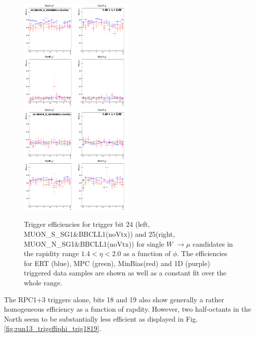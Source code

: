 \begin{figure}[ht]
  \centering
  \includegraphics[width=0.5\textwidth]{./figures/run13_trigeffiphi_eta1_trig24_lin.png}
  \includegraphics[width=0.5\textwidth]{./figures/run13_trigeffiphi_eta1_trig25_lin.png}
  \caption{
    Trigger efficiencies for trigger bit 24 (left, MUON\_S\_SG1\&BBCLL1(noVtx))
    and 25(right, MUON\_N\_SG1\&BBCLL1(noVtx)) for single $W$ $\rightarrow \mu$
    candidates in the rapidity range $ 1.4 < \eta < 2.0$ as a function of $\phi$.
    The efficiencies for ERT (blue), MPC (green), MinBias(red) and 1D (purple)
    triggered data samples are shown as well as a constant fit over the whole
    range.
  }
  \label{fig:run13_trigeffiphi_trig2425} 
\end{figure}

The RPC1+3 triggers alone, bits 18 and 19 also show generally a rather
homogeneous efficiency as a function of rapdity. However, two half-octants in
the North seem to be substantially less efficient as displayed in Fig.~
\ref{fig:run13_trigeffiphi_trig1819}.  

